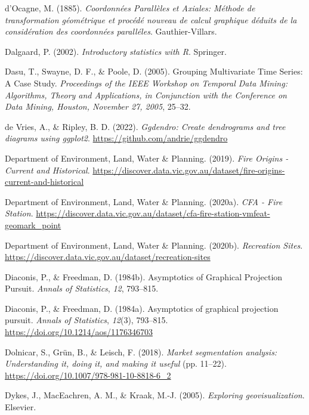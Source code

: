 \documentclass[
  letterpaper,
]{krantz}
\newlength{\cslhangindent}
\newenvironment{CSLReferences}[2] %
 {\begin{list}{}{%
  \setlength{\itemindent}{0pt}
  \setlength{\leftmargin}{0pt}
  \setlength{\parsep}{0pt}
  \ifodd #1
   \setlength{\leftmargin}{\cslhangindent}
   \setlength{\itemindent}{-1\cslhangindent}
  \fi
  \setlength{\itemsep}{#2\baselineskip}}}
 {\end{list}}
\begin{document}
\begin{CSLReferences}{1}{0}
d'Ocagne, M. (1885). \emph{{C}oordonnées {P}arallèles et {A}xiales:
{M}éthode de transformation géométrique et procédé nouveau de calcul
graphique déduits de la considération des coordonnées paralléles}.
Gauthier-Villars.

Dalgaard, P. (2002). \emph{Introductory statistics with {R}}. Springer.

Dasu, T., Swayne, D. F., \& Poole, D. (2005). Grouping {M}ultivariate
{T}ime {S}eries: A {C}ase {S}tudy. \emph{Proceedings of the IEEE
Workshop on {T}emporal {D}ata {M}ining: {A}lgorithms, {T}heory and
{A}pplications, in Conjunction with the Conference on Data Mining,
Houston, November 27, 2005}, 25--32.

de Vries, A., \& Ripley, B. D. (2022). \emph{Ggdendro: Create
dendrograms and tree diagrams using ggplot2}.
\url{https://github.com/andrie/ggdendro}

Department of Environment, Land, Water \& Planning. (2019). \emph{{Fire
Origins - Current and Historical}}.
\url{https://discover.data.vic.gov.au/dataset/fire-origins-current-and-historical}

Department of Environment, Land, Water \& Planning. (2020a). \emph{{CFA
- Fire Station}}.
\url{https://discover.data.vic.gov.au/dataset/cfa-fire-station-vmfeat-geomark_point}

Department of Environment, Land, Water \& Planning. (2020b).
\emph{{Recreation Sites}}.
\url{https://discover.data.vic.gov.au/dataset/recreation-sites}

Diaconis, P., \& Freedman, D. (1984b). {A}symptotics of {G}raphical
{P}rojection {P}ursuit. \emph{Annals of Statistics}, \emph{12},
793--815.

Diaconis, P., \& Freedman, D. (1984a). Asymptotics of graphical
projection pursuit. \emph{Annals of Statistics}, \emph{12}(3), 793--815.
\url{https://doi.org/10.1214/aos/1176346703}

Dolnicar, S., Grün, B., \& Leisch, F. (2018). \emph{Market segmentation
analysis: Understanding it, doing it, and making it useful} (pp.
11--22). \url{https://doi.org/10.1007/978-981-10-8818-6_2}

Dykes, J., MacEachren, A. M., \& Kraak, M.-J. (2005). \emph{Exploring
geovisualization}. Elsevier.


\end{CSLReferences}
\end{document}
